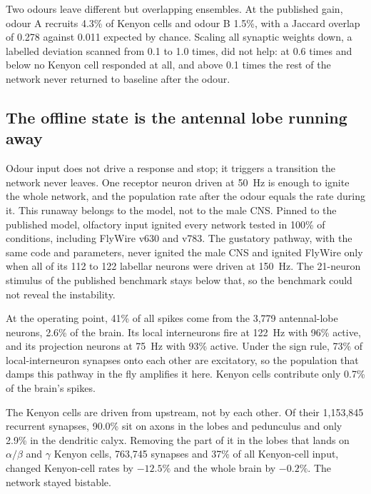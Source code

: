 \documentclass[11pt]{article}
\begin{document}
Two odours leave different but overlapping ensembles. At the published gain, odour A recruits 4.3\% of Kenyon cells and odour B 1.5\%, with a Jaccard overlap of 0.278 against 0.011 expected by chance. Scaling all synaptic weights down, a labelled deviation scanned from 0.1 to 1.0 times, did not help: at 0.6 times and below no Kenyon cell responded at all, and above 0.1 times the rest of the network never returned to baseline after the odour.

\subsection{The offline state is the antennal lobe running away}
Odour input does not drive a response and stop; it triggers a transition the network never leaves. One receptor neuron driven at 50~Hz is enough to ignite the whole network, and the population rate after the odour equals the rate during it. This runaway belongs to the model, not to the male CNS. Pinned to the published model, olfactory input ignited every network tested in 100\% of conditions, including FlyWire v630 and v783. The gustatory pathway, with the same code and parameters, never ignited the male CNS and ignited FlyWire only when all of its 112 to 122 labellar neurons were driven at 150~Hz. The 21-neuron stimulus of the published benchmark stays below that, so the benchmark could not reveal the instability.

At the operating point, 41\% of all spikes come from the 3,779 antennal-lobe neurons, 2.6\% of the brain. Its local interneurons fire at 122~Hz with 96\% active, and its projection neurons at 75~Hz with 93\% active. Under the sign rule, 73\% of local-interneuron synapses onto each other are excitatory, so the population that damps this pathway in the fly amplifies it here. Kenyon cells contribute only 0.7\% of the brain's spikes.

The Kenyon cells are driven from upstream, not by each other. Of their 1,153,845 recurrent synapses, 90.0\% sit on axons in the lobes and pedunculus and only 2.9\% in the dendritic calyx. Removing the part of it in the lobes that lands on $\alpha/\beta$ and $\gamma$ Kenyon cells, 763,745 synapses and 37\% of all Kenyon-cell input, changed Kenyon-cell rates by $-12.5\%$ and the whole brain by $-0.2\%$. The network stayed bistable.
\end{document}
